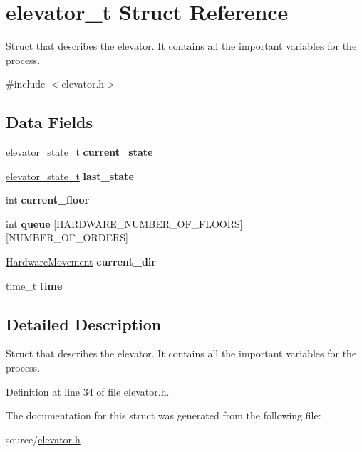 \hypertarget{structelevator__t}{}\section{elevator\+\_\+t Struct Reference}
\label{structelevator__t}


Struct that describes the elevator. It contains all the important variables for the process.  




{\ttfamily \#include $<$elevator.\+h$>$}

\subsection*{Data Fields}
\begin{DoxyCompactItemize}
\item 
\mbox{\label{structelevator__t_a862a75e55dbf0a89e85583636d38a1e1}} 
\hyperlink{elevator_8h_a213dad15e4e24f653a4ac19140d9378a}{elevator\+\_\+state\+\_\+t} {\bfseries current\+\_\+state}
\item 
\mbox{\label{structelevator__t_a9202cbafb36d8a8b7dd255e3a0b0e655}} 
\hyperlink{elevator_8h_a213dad15e4e24f653a4ac19140d9378a}{elevator\+\_\+state\+\_\+t} {\bfseries last\+\_\+state}
\item 
\mbox{\label{structelevator__t_a609db3bbfb46fc4f469ada5e60c94bad}} 
int {\bfseries current\+\_\+floor}
\item 
\mbox{\label{structelevator__t_a98f29d65561d428e9f1b2bad976527b6}} 
int {\bfseries queue} \mbox{[}H\+A\+R\+D\+W\+A\+R\+E\+\_\+\+N\+U\+M\+B\+E\+R\+\_\+\+O\+F\+\_\+\+F\+L\+O\+O\+RS\mbox{]}\mbox{[}N\+U\+M\+B\+E\+R\+\_\+\+O\+F\+\_\+\+O\+R\+D\+E\+RS\mbox{]}
\item 
\mbox{\label{structelevator__t_ad37022b0f315cb07e64e6e244c310fee}} 
\hyperlink{hardware_8h_a2167c399a24df296afc432bcb88228af}{Hardware\+Movement} {\bfseries current\+\_\+dir}
\item 
\mbox{\label{structelevator__t_a25fe12042195c16ea9502297dd950b95}} 
time\+\_\+t {\bfseries time}
\end{DoxyCompactItemize}


\subsection{Detailed Description}
Struct that describes the elevator. It contains all the important variables for the process. 

Definition at line 34 of file elevator.\+h.



The documentation for this struct was generated from the following file\+:\begin{DoxyCompactItemize}
\item 
source/\hyperlink{elevator_8h}{elevator.\+h}\end{DoxyCompactItemize}
